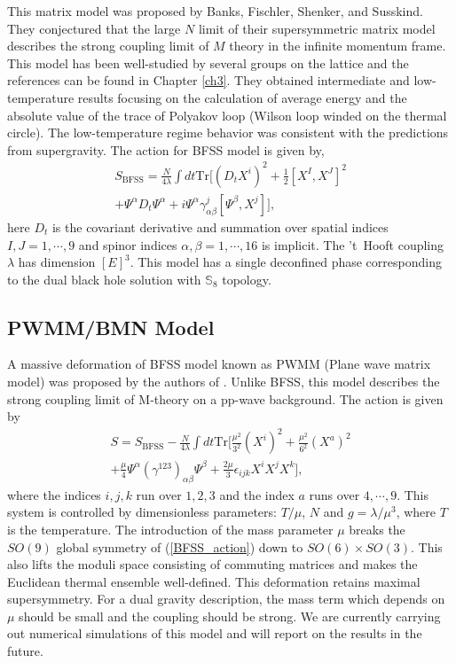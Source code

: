 This matrix model was proposed by Banks, Fischler, Shenker, and Susskind. They conjectured that the large $N$ limit of their 
supersymmetric matrix model describes the strong coupling limit of $M$ theory in the infinite momentum frame. 
This model has been well-studied by several groups on the lattice and the references can be 
found in Chapter \ref{ch3}. They obtained intermediate and low-temperature results focusing on the 
calculation of average energy and the absolute value of the trace of Polyakov loop (Wilson loop winded on the thermal circle). 
The low-temperature regime behavior was consistent with the predictions from supergravity. 
The action for BFSS model is given by, 
\begin{align}
S_{\text{BFSS}} = \frac{N}{4\lambda} \int dt \mathrm{Tr} \Bigg[
  (D_t X^i)^2  + \frac{1}{2} \left[X^I,X^J\right]^2 \nonumber \\  +  \Psi^\alpha D_t \Psi^\alpha  
 + i \Psi^\alpha \gamma_{\alpha \beta}^j [\Psi^\beta,X^j] \Bigg],
\label{BFSS_action}
\end{align}
here $D_t$ is the covariant derivative and summation over spatial indices 
$I,J=1,\cdots,9$ and  spinor indices $\alpha,\beta=1,\cdots,16$ is implicit. 
The 't~Hooft coupling $\lambda$ has dimension $[E]^3$. 
This model has a single deconfined phase corresponding to the dual 
black hole solution with $\mathbb{S}_{8}$ topology. 


\subsection{PWMM/BMN Model}
A massive deformation of BFSS model known as 
PWMM (Plane wave matrix model) was proposed by the authors of \cite{Berenstein:2002jq}. 
Unlike BFSS, this model describes the strong coupling limit of M-theory on a pp-wave background. 
The action is given by
\begin{align}
S=S_{\text{BFSS}}-\frac{N}{4\lambda} \int dt \mathrm{Tr} \Bigg[
\frac{\mu^2}{ 3^2} ( X^i)^2 + \frac{\mu^2}{ 6^2} (X^a)^2 \nonumber \\ + \frac{\mu}{4}\Psi^\alpha \left(\gamma^{123}\right)_{\alpha \beta} \Psi^\beta 
+\frac{2\mu}{3} \epsilon_{ijk} X^iX^jX^k \Bigg] ,
\label{PWMM_action}
\end{align}
where the indices $i,j,k$ run over $1,2,3$ and the index $a$ runs over $4,\cdots,9$.
This system is controlled by dimensionless parameters: $T/\mu$, $N$ and $ g=\lambda/\mu^3$, where $T$ is the temperature.
The introduction of the mass parameter $\mu$ breaks the $SO(9)$ global symmetry of (\ref{BFSS_action}) down to $SO(6)\times SO(3)$. This also lifts the moduli space consisting of commuting matrices and makes the 
Euclidean thermal ensemble well-defined. This deformation retains maximal supersymmetry. For a 
dual gravity description, the mass term which depends on $\mu$ should be small and the coupling should be strong. 
We are currently carrying out numerical simulations of this model and will report on the results in the future. 



